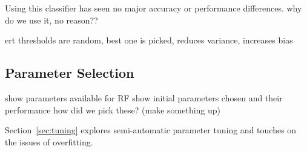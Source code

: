 Using this classifier has seen no major accuracy or performance differences.
why do we use it, no reason??

ert thresholds are random, best one is picked, reduces variance, increases bias

\subsection{Parameter Selection}
show parameters available for RF
show initial parameters chosen and their performance
how did we pick these? (make something up)

Section~\ref{sec:tuning} explores semi-automatic parameter tuning and touches on
the issues of overfitting.
